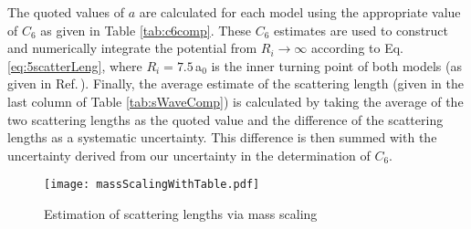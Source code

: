 The quoted values of $a$ are calculated for each model using the appropriate value of $C_6$ as given in Table \ref{tab:c6comp}.
These $C_6$ estimates are used to construct and numerically integrate the potential from $R_i\rightarrow\infty$ according to Eq.\,\ref{eq:5scatterLeng}, where $R_i=7.5$\,a$_0$ is the inner turning point of both models (as given in Ref.\,\cite{Stein2010}).
Finally, the average estimate of the scattering length (given in the last column of Table \ref{tab:sWaveComp}) is calculated by taking the average of the two scattering lengths as the quoted value and the difference of the scattering lengths as a systematic uncertainty.
This difference is then summed with the uncertainty derived from our uncertainty in the determination of $C_6$.
	\begin{figure} 
	\centerline{
	  \texttt{[image: massScalingWithTable.pdf]}}
	  \caption{Estimation of scattering lengths via mass scaling}{}
	  \label{fig:massScaling}
	\end{figure}
%
%
%
%



